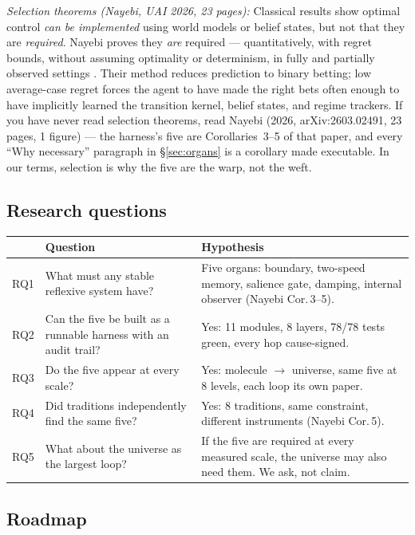 \documentclass[11pt]{article}
\begin{document}
\textit{Selection theorems (Nayebi, UAI 2026, 23 pages):} Classical results show optimal control \emph{can be implemented} using world models or belief states, but not that they are \emph{required}. Nayebi proves they \emph{are} required --- quantitatively, with regret bounds, without assuming optimality or determinism, in fully and partially observed settings \citep{nayebi2026}. Their method reduces prediction to binary betting; low average-case regret forces the agent to have made the right bets often enough to have implicitly learned the transition kernel, belief states, and regime trackers. If you have never read selection theorems, read Nayebi (2026, arXiv:2603.02491, 23 pages, 1 figure) --- the harness's five are Corollaries~3--5 of that paper, and every ``Why necessary'' paragraph in \S\ref{sec:organs} is a corollary made executable. In our terms, selection is why the five are the warp, not the weft.

\subsection*{Research questions}

\begin{center}
\small
\begin{tabular}{p{0.9cm}p{5.6cm}p{5.6cm}}
\toprule
 & Question & Hypothesis \\
\midrule
RQ1 & What must any stable reflexive system have? & Five organs: boundary, two-speed memory, salience gate, damping, internal observer (Nayebi Cor.\,3--5). \\
RQ2 & Can the five be built as a runnable harness with an audit trail? & Yes: 11 modules, 8 layers, 78/78 tests green, every hop cause-signed. \\
RQ3 & Do the five appear at every scale? & Yes: molecule $\to$ universe, same five at 8 levels, each loop its own paper. \\
RQ4 & Did traditions independently find the same five? & Yes: 8 traditions, same constraint, different instruments (Nayebi Cor.\,5). \\
RQ5 & What about the universe as the largest loop? & If the five are required at every measured scale, the universe may also need them. We ask, not claim. \\
\bottomrule
\end{tabular}
\end{center}

\subsection*{Roadmap}
\end{document}
